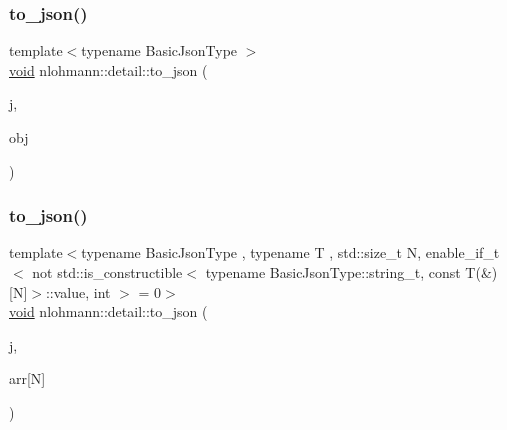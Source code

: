 \subsubsection{\texorpdfstring{to\_json()}{to\_json()}\hspace{0.1cm}{\footnotesize\ttfamily [13/17]}}
{\footnotesize\ttfamily template$<$typename Basic\+Json\+Type $>$ \\
\mbox{\hyperlink{namespacenlohmann_1_1detail_a59fca69799f6b9e366710cb9043aa77d}{void}} nlohmann\+::detail\+::to\+\_\+json (\begin{DoxyParamCaption}\item[{Basic\+Json\+Type \&}]{j,  }\item[{typename Basic\+Json\+Type\+::object\+\_\+t \&\&}]{obj }\end{DoxyParamCaption})}

\mbox{\label{namespacenlohmann_1_1detail_a20ea5175c8999fc8b673e46b892f71f6}} 
\subsubsection{\texorpdfstring{to\_json()}{to\_json()}\hspace{0.1cm}{\footnotesize\ttfamily [14/17]}}
{\footnotesize\ttfamily template$<$typename Basic\+Json\+Type , typename T , std\+::size\+\_\+t N, enable\+\_\+if\+\_\+t$<$ not std\+::is\+\_\+constructible$<$ typename Basic\+Json\+Type\+::string\+\_\+t, const T(\&)\mbox{[}\+N\mbox{]}$>$\+::value, int $>$  = 0$>$ \\
\mbox{\hyperlink{namespacenlohmann_1_1detail_a59fca69799f6b9e366710cb9043aa77d}{void}} nlohmann\+::detail\+::to\+\_\+json (\begin{DoxyParamCaption}\item[{Basic\+Json\+Type \&}]{j,  }\item[{const \mbox{\hyperlink{_keyboard_event_8h_adf1f3edb9115acb0a1e04209b7a9937b}{T}}(\&)}]{arr\mbox{[}\+N\mbox{]} }\end{DoxyParamCaption})}

\mbox{\label{namespacenlohmann_1_1detail_aa30611f74062379d3420c40487cf3bb3}} 
